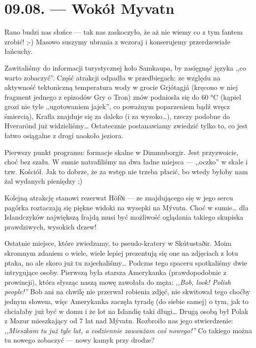 \chapter*{09.08. --- Wokół Myvatn}

Rano budzi nas słońce --- tak nas zaskoczyło, że aż nie wiemy co z tym fantem zrobić! ;-) Masowo suszymy ubrania z wczoraj i konserujemy przerdzewiałe łańcuchy.

Zawitaliśmy do informacji turystycznej koło Samkaupa, by zasięgnąć języka ,,co warto zobaczyć''. Część atrakcji odpadła w przedbiegach: ze względu na aktywność tektoniczną temperatura wody w grocie Grjótagjá (kręcono w niej fragment jednego z epizodów Gry o Tron) znów podniosła się do 60 °C (kąpiel grozi nie tyle ,,ugotowaniem jajek'', co poważnym poparzeniem bądź wręcz śmiercią), Krafla znajduje się za daleko (i za wysoko…), rzeczy podobne do Hverarönd już widzieliśmy… Ostatecznie postanawiamy zwiedzić tylko to, co jest łatwo osiągalne z drogi naokoło jeziora.

Pierwszy punkt programu: formacje skalne w Dimmuborgir. Jest przyzwoicie, choć bez szału. W sumie natrafiliśmy na dwa ładne miejsca --- ,,oczko'' w skale i tzw. Kościół. Jak to dobrze, że za wstęp nie trzeba płacić, bo wtedy byłoby nam żal wydanych pieniędzy ;)


Kolejną atrakcję stanowi rezerwat Höfði --- ze znajdującego się w jego sercu pagórka roztaczają się piękne widoki na wysepki na Mývatn. Choć w sumie… dla Islandczyków największą frajdą musi być możliwość oglądania takiego skupiska prawdziwych, wysokich drzew!

Ostatnie miejsce, które zwiedzamy, to pseudo-kratery w Skútustaðir. Moim skromnym zdaniem o wiele, wiele lepiej prezentują się one na zdjęciach z lotu ptaka, no ale skoro już tu zajechaliśmy… Podczas tego spaceru spotkaliśmy dwie intrygujące osoby. Pierwszą była starsza Amerykanka (prawdopodobnie z prowincji), która słysząc naszą mowę zawołała do męża: \emph{,,Bob, look! Polish people!''} Bob ani na chwilę nie przerwał robienia zdjęć, nie skwitował tego choćby jednym słowem, więc Amerykanka zaczęła tyradę (do siebie samej) o tym, jak to chciałaby już być w domu i że lot na Islandię taki długi… Drugą osobą był Polak z Mazur mieszkający od 7 lat nad Mývatn. Rozbroiło nas jego stwierdzenie: \emph{,,Mieszkam tu już tyle lat, a codziennie zauważam coś nowego!''} Co takiego można tu nowego zobaczyć --- nowy kamyk przy drodze?

